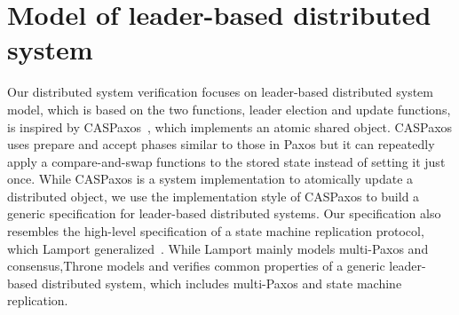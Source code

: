 \section{Model of leader-based distributed system}
Our distributed system verification focuses on leader-based distributed system model, 
which is based on the two functions,
leader election and update functions, is inspired by CASPaxos~\cite{caspaxos},
which implements an atomic shared object. CASPaxos uses prepare and accept
phases similar to those in Paxos but it can repeatedly apply a compare-and-swap
functions to the stored state instead of setting it just once. While CASPaxos is a system implementation
to atomically update a distributed object, we use the implementation style of
CASPaxos to build a generic specification for leader-based distributed systems.
Our specification also resembles the high-level specification of a state machine
replication protocol, which Lamport generalized~\cite{generalizedconsensus}.
While Lamport mainly models multi-Paxos and consensus,Throne models and
verifies common properties of a generic leader-based distributed system,
which includes multi-Paxos and state machine replication.





